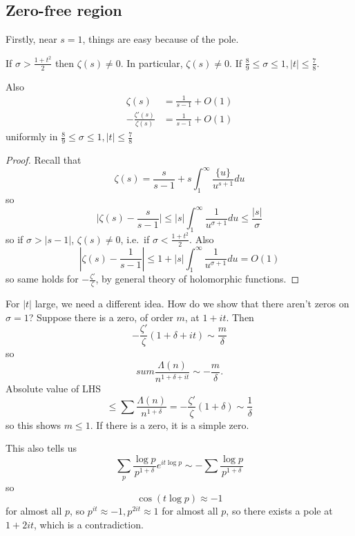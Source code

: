 \documentclass[a4paper]{article}
\theoremstyle{definition}
\begin{document}
\subsection{Zero-free region}

Firstly, near \(s = 1\), things are easy because of the pole.

\begin{theorem}
  If \(\sigma > \frac{1 + t^2}{2}\) then \(\zeta(s) \neq 0\). In particular, \(\zeta(s) \neq 0\). If \(\frac{8}{9} \leq \sigma \leq 1, |t| \leq \frac{7}{8}\).

  Also
  \begin{align*}
    \zeta(s) &= \frac{1}{s - 1} + O(1) \\
    - \frac{\zeta'(s)}{\zeta(s)} &= \frac{1}{s - 1} + O(1)
  \end{align*}
  uniformly in \(\frac{8}{9} \leq \sigma \leq 1, |t| \leq \frac{7}{8}\)
\end{theorem}

\begin{proof}
  Recall that
  \[
    \zeta(s) = \frac{s}{s - 1} + s \int_1^\infty \frac{\{u\}}{u^{s + 1}} du
  \]
  so
  \[
    \Big| \zeta(s) - \frac{s}{s - 1} \Big| \leq |s| \int_1^\infty \frac{1}{u^{\sigma + 1}} du \leq \frac{|s|}{\sigma}
    \]
    so if \(\sigma > |s - 1|\), \(\zeta(s) \neq 0\), i.e.\ if \(\sigma < \frac{1 + t^2}{2}\). Also
    \[
      |\zeta(s) - \frac{1}{s - 1}| \leq 1 + |s| \int_1^\infty \frac{1}{u^{\sigma + 1}} du = O(1)
    \]
    so same holds for \(- \frac{\zeta'}{\zeta}\), by general theory of holomorphic functions.
\end{proof}

For \(|t|\) large, we need a different idea. How do we show that there aren't zeros on \(\sigma = 1\)? Suppose there is a zero, of order \(m\), at \(1 + it\). Then
\[
  - \frac{\zeta'}{\zeta} (1 + \delta + it) \sim \frac{m}{\delta}
\]
so
\[
  sum \frac{\Lambda(n)}{n^{1 + \delta + it}} \sim -\frac{m}{\delta}.
\]
Absolute value of LHS
\[
  \leq \sum \frac{\Lambda(n)}{n^{1 + \delta}}
  = - \frac{\zeta'}{\zeta} (1 + \delta) \sim \frac{1}{\delta}
\]
so this shows \(m \leq 1\). If there is a zero, it is a simple zero.

This also tells us
\[
  \sum_p \frac{\log p}{p^{1 + \delta}} e^{i t \log p} \sim - \sum \frac{\log p}{p^{1 + \delta}}
\]
so
\[
  \cos (t \log p) \approx -1
\]
for almost all \(p\), so \(p^{it} \approx -1, p^{2it} \approx 1\) for almost all \(p\), so there exists a pole at \(1 + 2i t\), which is a contradiction.
\end{document}
